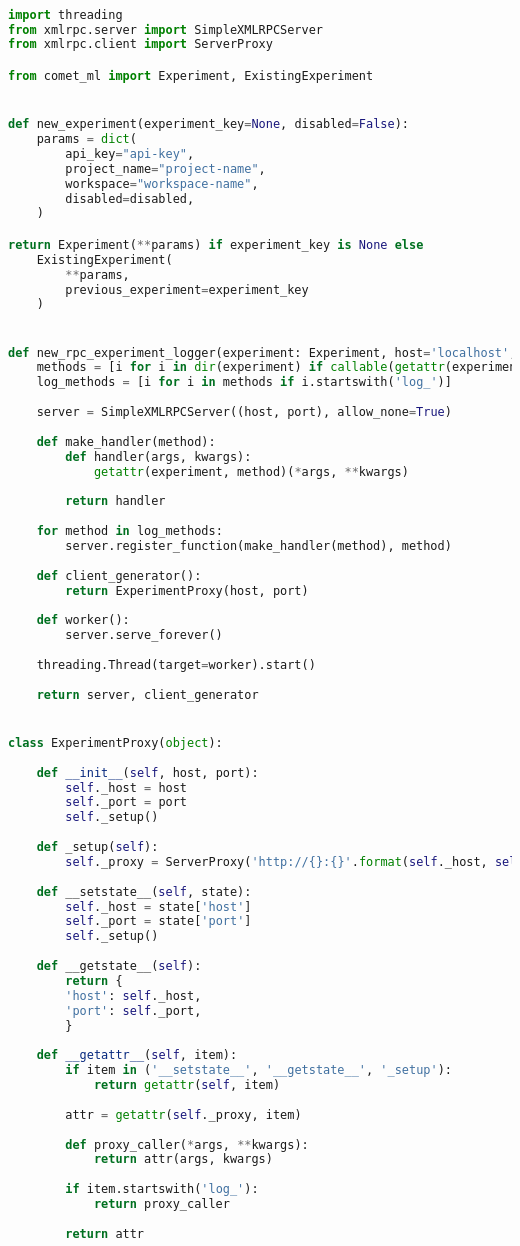 \begin{lstlisting}[language=Python, caption=comet.py: Logs experiment results and model weights to comet.ml platform]

import threading
from xmlrpc.server import SimpleXMLRPCServer
from xmlrpc.client import ServerProxy

from comet_ml import Experiment, ExistingExperiment


def new_experiment(experiment_key=None, disabled=False):
	params = dict(
		api_key="api-key",
		project_name="project-name",
		workspace="workspace-name",
		disabled=disabled,
	)

return Experiment(**params) if experiment_key is None else 
	ExistingExperiment(
		**params,
		previous_experiment=experiment_key
	)


def new_rpc_experiment_logger(experiment: Experiment, host='localhost', port=8085):
	methods = [i for i in dir(experiment) if callable(getattr(experiment, i))]
	log_methods = [i for i in methods if i.startswith('log_')]
	
	server = SimpleXMLRPCServer((host, port), allow_none=True)
	
	def make_handler(method):
		def handler(args, kwargs):
			getattr(experiment, method)(*args, **kwargs)
		
		return handler
	
	for method in log_methods:
		server.register_function(make_handler(method), method)
	
	def client_generator():
		return ExperimentProxy(host, port)
	
	def worker():
		server.serve_forever()
	
	threading.Thread(target=worker).start()
	
	return server, client_generator


class ExperimentProxy(object):
	
	def __init__(self, host, port):
		self._host = host
		self._port = port
		self._setup()
	
	def _setup(self):
		self._proxy = ServerProxy('http://{}:{}'.format(self._host, self._port), allow_none=True)
	
	def __setstate__(self, state):
		self._host = state['host']
		self._port = state['port']
		self._setup()
	
	def __getstate__(self):
		return {
		'host': self._host,
		'port': self._port,
		}
	
	def __getattr__(self, item):
		if item in ('__setstate__', '__getstate__', '_setup'):
			return getattr(self, item)
		
		attr = getattr(self._proxy, item)
		
		def proxy_caller(*args, **kwargs):
			return attr(args, kwargs)
		
		if item.startswith('log_'):
			return proxy_caller
		
		return attr


\end{lstlisting}




